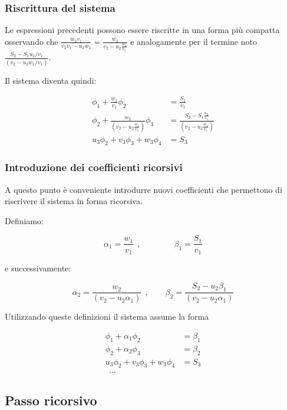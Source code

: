 \subsubsection*{Riscrittura del sistema}

Le espressioni precedenti possono essere riscritte in una forma più compatta osservando che $\frac{w_2 v_1}{v_2 v_1 - u_2 w_1}=\frac{w_2}{v_2 - u_2 \frac{w_1}{v_1}}$ e analogamente per il termine noto $\frac{S_2 - S_1 u_2/v_1}{(v_2 - u_2 w_1/v_1)}$.

Il sistema diventa quindi:

\[ \begin{aligned}
	\phi_1 + \frac{w_1}{v_1}\phi_2 &= \frac{S_1}{v_1} \\
	\phi_2 +
	\frac{w_2}{\left(v_2 - u_2 \frac{w_1}{v_1}\right)} \phi_3
	&=
	\frac{S_2 - S_1\frac{u_2}{v_1}}
	{\left(v_2 - u_2 \frac{w_1}{v_1}\right)}\\
	u_3 \phi_2 + v_3 \phi_3 + w_3 \phi_4 &= S_3
\end{aligned}\]

\subsubsection*{Introduzione dei coefficienti ricorsivi}

A questo punto è conveniente introdurre nuovi coefficienti che permettono di riscrivere il sistema in forma ricorsiva.

Definiamo:

\[\alpha_1 = \frac{w_1}{v_1}\ \ ,\qquad \qquad 
\beta_1 = \frac{S_1}{v_1}\]

e successivamente:

\[ \alpha_2 = \frac{w_2}{(v_2 - u_2 \alpha_1)}\ \ , \quad \quad \beta_2 = \frac{S_2 - u_2 \beta_1}{(v_2 - u_2\alpha_1)}\]


Utilizzando queste definizioni il sistema assume la forma

\[\begin{aligned}
	\phi_1 + \alpha_1 \phi_2 &= \beta_1 \\
	\phi_2 + \alpha_2 \phi_3 &= \beta_2 \\
	u_3 \phi_2 + v_3 \phi_3 + w_3 \phi_4 &= S_3\\
	\ \ \dots
\end{aligned}\]

\subsection*{Passo ricorsivo}

